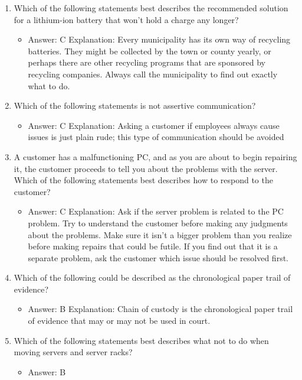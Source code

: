 \documentclass{article}
\begin{document}
\begin{enumerate}
\begin{itemize}
    \end{itemize}
    \item Which of the following statements best describes the recommended
solution for a lithium-ion battery that won’t hold a charge any longer?
    \begin{itemize}
        \item Answer: C
Explanation: Every municipality has its own way of recycling batteries. They might be
collected by the town or county yearly, or perhaps there are other recycling programs
that are sponsored by recycling companies. Always call the municipality to find out
exactly what to do.
    \end{itemize}
    \item Which of the following statements is not assertive communication?
    \begin{itemize}
        \item Answer: C
Explanation: Asking a customer if employees always cause issues is just plain rude;
this type of communication should be avoided
    \end{itemize}
    \item A customer has a malfunctioning PC, and as you are about to
begin repairing it, the customer proceeds to tell you about the
problems with the server. Which of the following statements best
describes how to respond to the customer?
    \begin{itemize}
        \item Answer: C
Explanation: Ask if the server problem is related to the PC problem. Try to understand
the customer before making any judgments about the problems. Make sure it isn’t a
bigger problem than you realize before making repairs that could be futile. If you find
out that it is a separate problem, ask the customer which issue should be resolved
first.
    \end{itemize}
    \item Which of the following could be described as the chronological
paper trail of evidence?
    \begin{itemize}
        \item Answer: B
Explanation: Chain of custody is the chronological paper trail of evidence that may or
may not be used in court.
    \end{itemize}
    \item Which of the following statements best describes what not to do
when moving servers and server racks?
    \begin{itemize}
        \item Answer: B

\end{itemize}
\end{enumerate}
\end{document}
